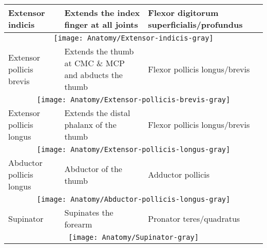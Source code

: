 \documentclass[main]{subfiles}
\begin{document}
\begin{longtable}{p{3.2cm}p{5.5cm}|l}
Extensor indicis & Extends the index finger at all joints & Flexor digitorum superficialis/profundus \\*
\hline
\multicolumn{3}{c}{\texttt{[image: Anatomy/Extensor-indicis-gray]}}\\
\hline

Extensor pollicis brevis & Extends the thumb at CMC \& MCP and abducts the thumb & Flexor pollicis longus/brevis\\*
\hline
\multicolumn{3}{c}{\texttt{[image: Anatomy/Extensor-pollicis-brevis-gray]}}\\
\hline

Extensor pollicis longus & Extends the distal phalanx of the thumb & Flexor pollicis longus/brevis\\*
\hline
\multicolumn{3}{c}{\texttt{[image: Anatomy/Extensor-pollicis-longus-gray]}}\\
\hline

Abductor pollicis longus & Abductor of the thumb & Adductor pollicis\\*
\hline
\multicolumn{3}{c}{\texttt{[image: Anatomy/Abductor-pollicis-longus-gray]}}\\
\hline

Supinator & Supinates the forearm & Pronator teres/quadratus\\*
\hline
\multicolumn{3}{c}{\texttt{[image: Anatomy/Supinator-gray]}}\\
\hline
\end{longtable}
\end{document}
